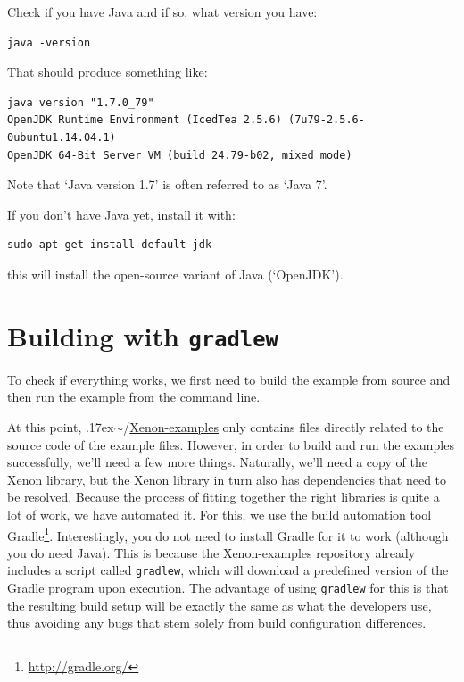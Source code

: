 \documentclass[12pt, a4paper, twoside, openany, titlepage]{book}
\newcommand{\mytilde}{\raise.17ex\hbox{$\scriptstyle\sim$}}
\begin{document}
Check if you have Java and if so, what version you have:
\begin{lstlisting}[style=basic,style=bash]
java -version
\end{lstlisting}
That should produce something like:
\begin{lstlisting}[style=basic,style=bash]
java version "1.7.0_79"
OpenJDK Runtime Environment (IcedTea 2.5.6) (7u79-2.5.6-0ubuntu1.14.04.1)
OpenJDK 64-Bit Server VM (build 24.79-b02, mixed mode)
\end{lstlisting}
Note that `Java version 1.7' is often referred to as `Java 7'.

If you don't have Java yet, install it with:
\begin{lstlisting}[style=basic,style=bash]
sudo apt-get install default-jdk
\end{lstlisting}
this will install the open-source variant of Java (`OpenJDK').






\section{Building with \texttt{gradlew}}

To check if everything works, we first need to build the example from source and then run the example from the command line.

At this point, \mytilde/\url{Xenon-examples} only contains files directly related to the source code of the example files. However, in order to build and run the examples successfully, we'll need a few more things. Naturally, we'll need a copy of the Xenon library, but the Xenon library in turn also has dependencies that need to be resolved. Because the process of fitting together the right libraries is quite a lot of work, we have automated it. For this, we use the build automation tool Gradle\footnote{\url{http://gradle.org/}}. Interestingly, you do not need to install Gradle for it to work (although you do need Java). This is because the Xenon-examples repository already includes a script called \texttt{gradlew}, which will download a predefined version of the Gradle program upon execution. The advantage of using \texttt{gradlew} for this is that the resulting build setup will be exactly the same as what the developers use, thus avoiding any bugs that stem solely from build configuration differences.
\end{document}
